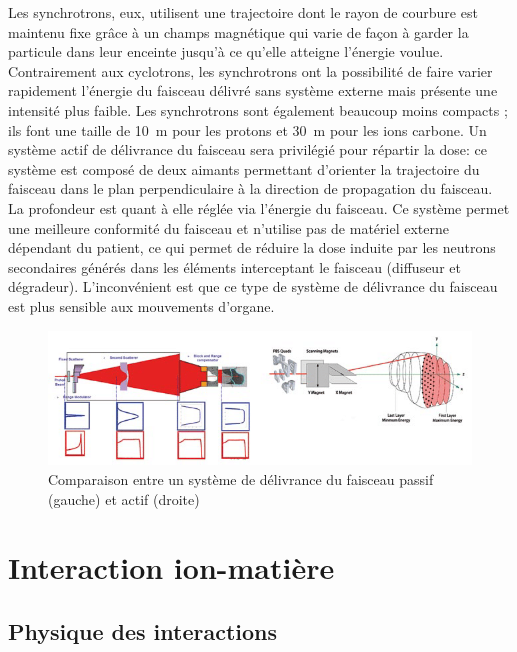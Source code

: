 \documentclass[11pt,a4paper,oldfontcommands]{memoir}
\begin{document}
Les synchrotrons, eux, utilisent une trajectoire dont le rayon de courbure est maintenu fixe grâce à un champs magnétique qui varie de façon à garder la particule dans leur enceinte jusqu'à ce qu'elle atteigne l'énergie voulue. Contrairement aux cyclotrons, les synchrotrons ont la possibilité de faire varier rapidement l'énergie du faisceau délivré sans système externe mais présente une intensité plus faible. Les synchrotrons sont également beaucoup moins compacts ; ils font une taille de 10~m pour les protons et 30~m pour les ions carbone. Un système actif de délivrance du faisceau sera privilégié pour répartir la dose: ce système est composé de deux aimants permettant d'orienter la trajectoire du faisceau dans le plan perpendiculaire à la direction de propagation du faisceau. La profondeur est quant à elle réglée via l'énergie du faisceau. Ce système permet une meilleure conformité du faisceau et n'utilise pas de matériel externe dépendant du patient, ce qui permet de réduire la dose induite par les neutrons secondaires générés dans les éléments interceptant le faisceau (diffuseur et dégradeur). L'inconvénient est que ce type de système de délivrance du faisceau est plus sensible aux mouvements d'organe. 

\begin{figure}[h!]
    \centering
    \includegraphics [scale = 0.7]{intro/Passive-left-and-active-right-beam-delivery-system-courtesy-of-IBA.png}
    \caption{Comparaison entre un système de délivrance du faisceau passif (gauche) et actif (droite) \cite{Nupecc}}
    \label{fig:my_label}
\end{figure}
\openany
\section{Interaction ion-matière}
\subsection{Physique des interactions}
\end{document}
